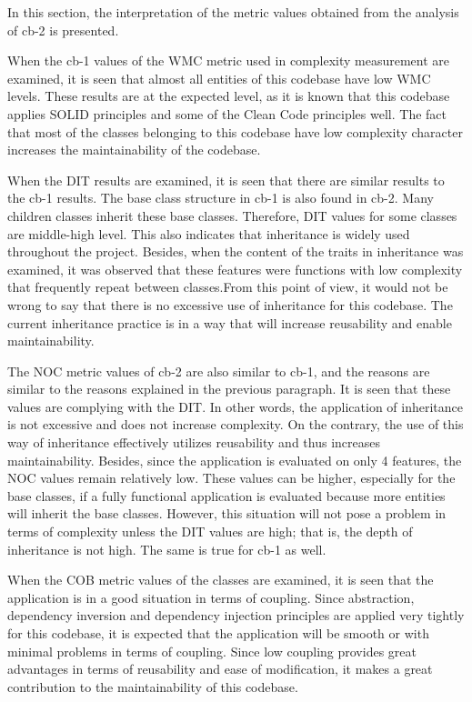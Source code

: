 In this section, the interpretation of the metric values obtained from the analysis of cb-2 is presented.

When the cb-1 values of the WMC metric used in complexity measurement are examined, it is seen that almost all entities of this codebase have low WMC levels. These results are at the expected level, as it is known that this codebase applies SOLID principles and some of the Clean Code principles well.
The fact that most of the classes belonging to this codebase have low complexity character increases the maintainability of the codebase.

When the DIT results are examined, it is seen that there are similar results to the cb-1 results. The base class structure in cb-1 is also found in cb-2. Many children classes inherit these base classes. Therefore, DIT values for some classes are middle-high level. This also indicates that inheritance is widely used throughout the project. Besides, when the content of the traits in inheritance was examined, it was observed that these features were functions with low complexity that frequently repeat between classes.From this point of view, it would not be wrong to say that there is no excessive use of inheritance for this codebase. The current inheritance practice is in a way that will increase reusability and enable maintainability.

The NOC metric values of cb-2 are also similar to cb-1, and the reasons are similar to the reasons explained in the previous paragraph. It is seen that these values are complying with the DIT. In other words, the application of inheritance is not excessive and does not increase complexity. On the contrary, the use of this way of inheritance effectively utilizes reusability and thus increases maintainability. Besides, since the application is evaluated on only 4 features, the NOC values remain relatively low. These values can be higher, especially for the base classes, if a fully functional application is evaluated because more entities will inherit the base classes. However, this situation will not pose a problem in terms of complexity unless the DIT values are high; that is, the depth of inheritance is not high. The same is true for cb-1 as well.

When the COB metric values of the classes are examined, it is seen that the application is in a good situation in terms of coupling. Since abstraction, dependency inversion and dependency injection principles are applied very tightly for this codebase, it is expected that the application will be smooth or with minimal problems in terms of coupling. Since low coupling provides great advantages in terms of reusability and ease of modification, it makes a great contribution to the maintainability of this codebase.

